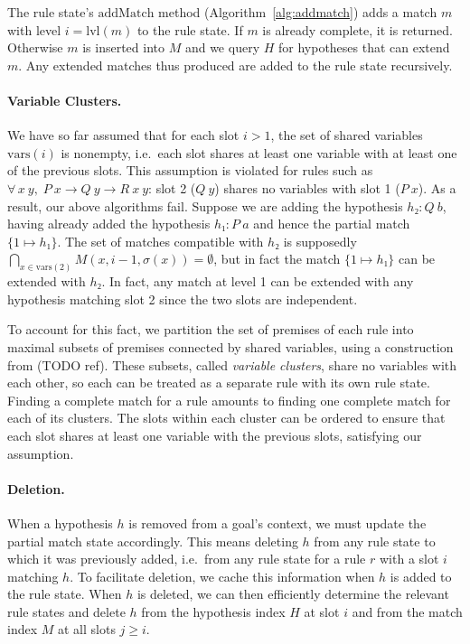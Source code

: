 \documentclass[runningheads]{llncs}
\newcommand{\All}[2]{\ensuremath{\forall\, #1,\; #2}}
\newcommand{\vars}{\ensuremath{\mathrm{vars}}}
\newcommand{\lvl}{\ensuremath{\mathrm{lvl}}}
\newcommand{\addMatch}{\ensuremath{\mathrm{addMatch}}}
\begin{document}
The rule state's $\addMatch$ method (Algorithm~\ref{alg:addmatch}) adds a match $m$ with level $i = \lvl(m)$ to the rule state.
If $m$ is already complete, it is returned.
Otherwise $m$ is inserted into $M$ and we query $H$ for hypotheses that can extend $m$.
Any extended matches thus produced are added to the rule state recursively.

\paragraph{Variable Clusters.}
We have so far assumed that for each slot $i > 1$, the set of shared variables $\vars(i)$ is nonempty, i.e.\ each slot shares at least one variable with at least one of the previous slots.
This assumption is violated for rules such as $\All{x~y}{P~x → Q~y → R~x~y}$: slot 2 ($Q~y$) shares no variables with slot 1 ($P~x$).
As a result, our above algorithms fail.
Suppose we are adding the hypothesis $h₂ : Q~b$, having already added the hypothesis $h₁ : P~a$ and hence the partial match $\{1 ↦ h₁\}$.
The set of matches compatible with $h₂$ is supposedly $\bigcap_{x \in \vars(2)} M(x, i-1, σ(x)) = ∅$, but in fact the match $\{1 ↦ h₁\}$ can be extended with $h₂$.
In fact, any match at level 1 can be extended with any hypothesis matching slot 2 since the two slots are independent.

To account for this fact, we partition the set of premises of each rule into maximal subsets of premises connected by shared variables, using a construction from (TODO ref).
These subsets, called \emph{variable clusters}, share no variables with each other, so each can be treated as a separate rule with its own rule state.
Finding a complete match for a rule amounts to finding one complete match for each of its clusters.
The slots within each cluster can be ordered to ensure that each slot shares at least one variable with the previous slots, satisfying our assumption.

\paragraph{Deletion.}
When a hypothesis $h$ is removed from a goal's context, we must update the partial match state accordingly.
This means deleting $h$ from any rule state to which it was previously added, i.e.\ from any rule state for a rule $r$ with a slot $i$ matching $h$.
To facilitate deletion, we cache this information when $h$ is added to the rule state.
When $h$ is deleted, we can then efficiently determine the relevant rule states and delete $h$ from the hypothesis index $H$ at slot $i$ and from the match index $M$ at all slots $j ≥ i$.
\end{document}
